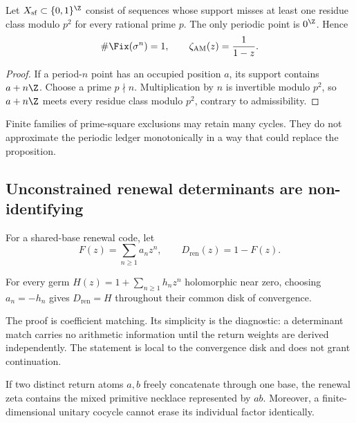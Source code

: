 \begin{proposition}
\label{prop:squarefree}
Let \(X_{\mathrm{sf}}\subset\{0,1\}^{\Z}\) consist of sequences whose support
misses at least one residue class modulo \(p^2\) for every rational prime
\(p\).  The only periodic point is \(0^{\Z}\).  Hence
\[
  \#\Fix(\sigma^n)=1,\qquad
  \zeta_{\mathrm{AM}}(z)=\frac{1}{1-z}.
\]
\end{proposition}

\begin{proof}
If a period-\(n\) point has an occupied position \(a\), its support contains
\(a+n\Z\).  Choose a prime \(p\nmid n\).  Multiplication by \(n\) is invertible
modulo \(p^2\), so \(a+n\Z\) meets every residue class modulo \(p^2\), contrary
to admissibility.
\end{proof}

Finite families of prime-square exclusions may retain many cycles.  They do
not approximate the periodic ledger monotonically in a way that could replace
the proposition.

\subsection{Unconstrained renewal determinants are non-identifying}

For a shared-base renewal code, let
\[
  F(z)=\sum_{n\ge1}a_nz^n,\qquad D_{\mathrm{ren}}(z)=1-F(z).
\]

\begin{proposition}
\label{prop:inverse-design}
For every germ \(H(z)=1+\sum_{n\ge1}h_nz^n\) holomorphic near zero, choosing
\(a_n=-h_n\) gives \(D_{\mathrm{ren}}=H\) throughout their common disk of
convergence.
\end{proposition}

The proof is coefficient matching.  Its simplicity is the diagnostic: a
determinant match carries no arithmetic information until the return weights
are derived independently.  The statement is local to the convergence disk
and does not grant continuation.

\begin{proposition}
\label{prop:mixed}
If two distinct return atoms \(a,b\) freely concatenate through one base, the
renewal zeta contains the mixed primitive necklace represented by \(ab\).
Moreover, a finite-dimensional unitary cocycle cannot erase its individual
factor identically.
\end{proposition}

